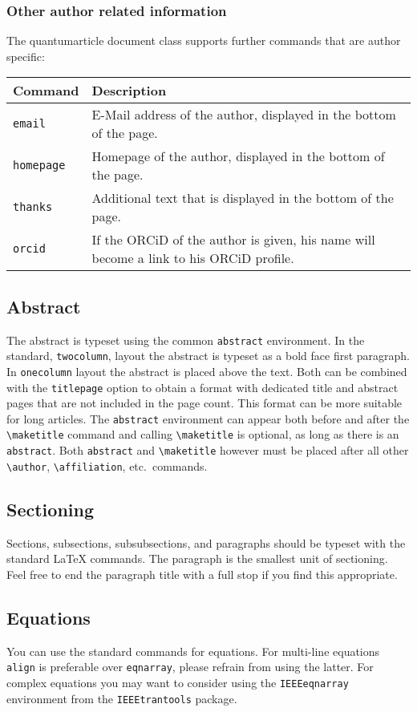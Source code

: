 \documentclass[a4paper,noarxiv,onecolumn]{quantumarticle}
\newenvironment{commands}
{\medskip\noindent\begin{longtable}{p{.20\columnwidth}p{.744\columnwidth}}
		\textsf{Command} & \textsf{Description} \\
		\midrule
	}
	{\bottomrule\end{longtable}}
\newcommand{\command}[2]{
	\small\texttt{#1} & {\small#2} \\
}
\begin{document}
	\subsubsection{Other author related information}
	The quantumarticle document class supports further commands that are author specific:
	\begin{commands}
		\command{email}{%
			E-Mail address of the author, displayed in the bottom of the page.
		}
	
		\command{homepage}{%
			Homepage of the author, displayed in the bottom of the page.
		}
	
		\command{thanks}{%
			Additional text that is displayed in the bottom of the page.
		}
	
		\command{orcid}{%
			If the ORCiD of the author is given, his name will become a link to his ORCiD profile.
		}
	\end{commands}
	
	\subsection{Abstract}
	The abstract is typeset using the common \texttt{abstract} environment. In the standard, \texttt{twocolumn}, layout the abstract is typeset as a bold face first paragraph.
	In \texttt{onecolumn} layout the abstract is placed above the text.
	Both can be combined with the \texttt{titlepage} option to obtain a format with dedicated title and abstract pages that are not included in the page count.
	This format can be more suitable for long articles.
	The \texttt{abstract} environment can appear both before and after the \texttt{\textbackslash{}maketitle} command and calling \texttt{\textbackslash{}maketitle} is optional, as long as there is an \texttt{abstract}.
	Both \texttt{abstract} and \texttt{\textbackslash{}maketitle} however must be placed after all other \texttt{\textbackslash{}author}, \texttt{\textbackslash{}affiliation}, etc.\ commands.
	
	\subsection{Sectioning}
	Sections, subsections, subsubsections, and paragraphs should be typeset with the standard LaTeX commands. The paragraph is the smallest unit of sectioning. Feel free to end the paragraph title with a full stop if you find this appropriate.
	
	\subsection{Equations}	
	You can use the standard commands for equations. For multi-line equations \texttt{align} is preferable over \texttt{eqnarray}, please refrain from using the latter.	For complex equations you may want to consider using the \texttt{IEEEeqnarray} environment from the \texttt{IEEEtrantools} package.
	
\end{document}
